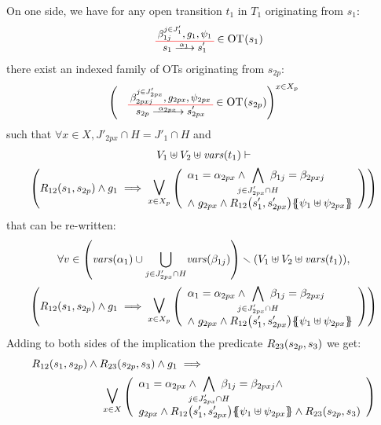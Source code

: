 \documentclass[runningheads]{llncs}
\begin{document}
\begin{enumerate}
On one side, we have for any open transition $t_1$ in $T_1$  originating from $s_1$:
\begin{align*}
\OTx{1}{}{1}{1} \in \fOT{s_1}
\end{align*}
there exist an indexed family of OTs originating from $s_{2p}$: 
\begin{align*}
\mpar{\OTx{2p}{x}{2px}{2px} \in \fOT{s_{2p}}}^{x \in X_p} 
\end{align*}
such that $\forall x \in X, J'_{2px} \cap H = J'_1 \cap H$ and
\begin{multline*}
V_1 \uplus V_2 \uplus \fvars{t_1} \vdash\\ \mpar{R_{12}\mpar{s_1, s_{2p}} \wedge g_1 \implies \operatorname*{\bigsymb{\bigvee}}_{x \in X_p} \mpar{\everymath{\displaystyle}
\begin{array}{l}
			\alpha_1 = \alpha_{2px} \wedge \bigwedge_\subbox{j \in J'_{2px} \cap H} \beta_{1j} = \beta_{2pxj} \\
			\nwedge g_{2px} \wedge R_{12}\mpar{s'_1, s'_{2px}}\psubst{\psi_1 \uplus \psi_{2px}}
		\end{array}}} 
\end{multline*}		
that can be re-written:
\begin{multline*}
\forall v \in \mpar{\fvars{\alpha_{1}}  \cup \bigcup_{j \in J'_{2px} \cap H} \!\fvars{\beta_{1j}}} \setminus \mpar{V_1 \uplus V_2 \uplus \fvars{t_1}}, \\ \mpar{R_{12}\mpar{s_1, s_{2p}} \wedge g_1 \implies \operatorname*{\bigsymb{\bigvee}}_{x \in X_p} \mpar{\everymath{\displaystyle}
\begin{array}{l}
			\alpha_1 = \alpha_{2px} \wedge \bigwedge_\subbox{j \in J'_{2px} \cap H} \beta_{1j} = \beta_{2pxj} \\
			\nwedge g_{2px} \wedge R_{12}\mpar{s'_1, s'_{2px}}\psubst{\psi_1 \uplus \psi_{2px}}
		\end{array}}} \\
	\end{multline*}	
\medskip
Adding to both sides of the implication the predicate $R_{23}{\left(s_{2p},s_3\right)}$ we get:
\begin{align*}
R_{12}\mpar{s_1, s_{2p}} \wedge R_{23}\mpar{s_{2p},s_3} \wedge g_1 \implies\hspace{5.5cm}\\ \operatorname*{\bigsymb{\bigvee}}_{x \in X} \mpar{\everymath{\displaystyle}
\begin{array}{l}
			\alpha_1 = \alpha_{2px} \wedge \bigwedge_\subbox{j \in J'_{2px} \cap H} \beta_{1j} = \beta_{2pxj} \land\\
			 g_{2px} \wedge R_{12}\mpar{s'_1, s'_{2px}}\psubst{\psi_1 \uplus \psi_{2px}} \land R_{23}\mpar{s_{2p},s_3}
		\end{array}} \\
\end{align*}		



\end{enumerate}
\end{document}
